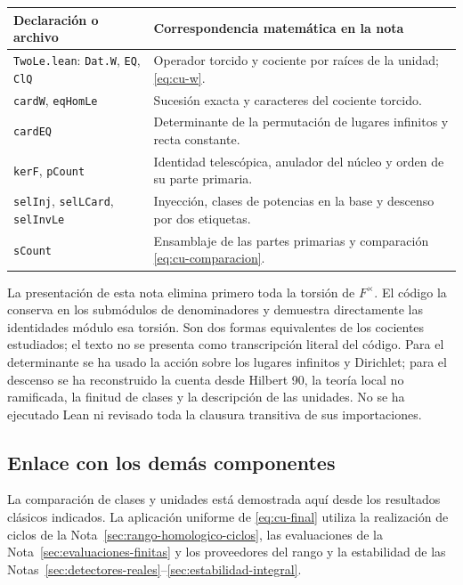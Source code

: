 \begin{center}\small
\begin{tabularx}{\textwidth}{@{}p{}Y@{}}
\toprule
Declaración o archivo & Correspondencia matemática en la nota\\\midrule
\texttt{TwoLe.lean}: \texttt{Dat.W}, \texttt{EQ}, \texttt{ClQ} & Operador torcido y cociente por raíces de la unidad; \eqref{eq:cu-w}.\\
\texttt{cardW}, \texttt{eqHomLe} & Sucesión exacta y caracteres del cociente torcido.\\
\texttt{cardEQ} & Determinante de la permutación de lugares infinitos y recta constante.\\
\texttt{kerF}, \texttt{pCount} & Identidad telescópica, anulador del núcleo y orden de su parte primaria.\\
\texttt{selInj}, \texttt{selLCard}, \texttt{selInvLe} & Inyección, clases de potencias en la base y descenso por dos etiquetas.\\
\texttt{sCount} & Ensamblaje de las partes primarias y comparación \eqref{eq:cu-comparacion}.\\\bottomrule
\end{tabularx}
\end{center}

La presentación de esta nota elimina primero toda la torsión de $F^\times$. El código la conserva en los submódulos de denominadores y demuestra directamente las identidades módulo esa torsión. Son dos formas equivalentes de los cocientes estudiados; el texto no se presenta como transcripción literal del código. Para el determinante se ha usado la acción sobre los lugares infinitos y Dirichlet; para el descenso se ha reconstruido la cuenta desde Hilbert 90, la teoría local no ramificada, la finitud de clases y la descripción de las unidades. No se ha ejecutado Lean ni revisado toda la clausura transitiva de sus importaciones.

\subsection{Enlace con los demás componentes}

La comparación de clases y unidades está demostrada aquí desde los resultados clásicos indicados. La aplicación uniforme de \eqref{eq:cu-final} utiliza la realización de ciclos de la Nota~\ref{sec:rango-homologico-ciclos}, las evaluaciones de la Nota~\ref{sec:evaluaciones-finitas} y los proveedores del rango y la estabilidad de las Notas~\ref{sec:detectores-reales}--\ref{sec:estabilidad-integral}.

